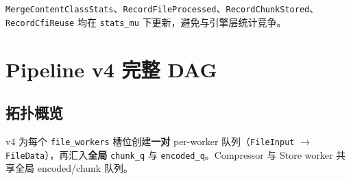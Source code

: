 \texttt{MergeContentClassStats}、\texttt{RecordFileProcessed}、\texttt{RecordChunkStored}、\texttt{RecordCfiReuse} 均在 \texttt{stats\_mu} 下更新，避免与引擎层统计竞争。

\section{Pipeline v4 完整 DAG}

\subsection{拓扑概览}

v4 为每个 \texttt{file\_workers} 槽位创建\textbf{一对} per-worker 队列（\texttt{FileInput} $\rightarrow$ \texttt{FileData}），再汇入\textbf{全局} \texttt{chunk\_q} 与 \texttt{encoded\_q}。Compressor 与 Store worker 共享全局 encoded/chunk 队列。

